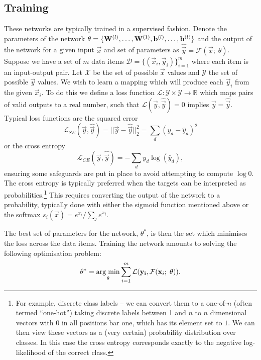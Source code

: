 \subsection{Training}
These networks are typically trained in a supervised fashion. Denote the parameters of the network
\(\theta = \{\mathbf{W}^{(l)}, \ldots, \mathbf{W}^{(1)}, \mathbf{b}^{(l)}, \ldots, \mathbf{b}^{(l)}\}\) and
the output of the network for a given input \(\vec{x}\) and set of parameters as 
\(\hat{\vec{y}} = \mathcal{F}(\vec{x};\; \theta)\). Suppose we have a set of \(m\) data items
\(\mathcal{D} = \{(\vec{x}_i, \vec{y}_i)\}_{i=1}^m\) where each item is an input-output pair. 
Let \(\mathcal{X}\) be the set of possible \(\vec{x}\) values and \(\mathcal{Y}\) the set of
possible \(\vec{y}\) values.
We
wish to learn a mapping which will produce each \(\vec{y}_i\) from the given \(\vec{x}_i\). 
To do this we define a loss function
\(\mathcal{L} : \mathcal{Y} \times \mathcal{Y} \to \mathbb{R}\) which maps pairs of valid outputs
to a real number, such that \(\mathcal{L}(\vec{y}, \hat{\vec{y}}) = 0\) implies 
\(\vec{y} = \hat{\vec{y}}\). Typical loss functions are the squared error
\begin{equation} \label{eq:squarederror}
	\mathcal{L}_{SE}(\vec{y}, \hat{\vec{y}}) = ||\vec{y} - \hat{\vec{y}}||^2_2 
	= \sum_d (y_d - \hat{y}_d)^2
\end{equation} or the cross entropy
\begin{equation}
	\mathcal{L}_{CE}(\vec{y}, \hat{\vec{y}}) = -\sum_d y_d \log(\hat{y}_d),
\end{equation} ensuring some safeguards are put in place to avoid attempting to compute \(\log 0\).
The cross entropy is typically preferred when the targets can be interpreted as
probabilities.\footnote{For example, discrete class labels -- we can convert them to a one-of-\(n\)
(often termed ``one-hot'') taking discrete labels between 1 and \(n\) to \(n\) dimensional vectors
with \(0\) in all positions bar one, which has its element set to \(1\). We can then view these
vectors as a (very certain) probability distribution over classes. In this case the cross entropy
corresponds exactly to the negative log-likelihood of the correct class.} This requires converting
the output of the network to a probability, typically done with either the sigmoid function 
mentioned above or the softmax \(s_i(\vec{x}) = e^{x_i}/\sum_j e^{x_j}\).

The best set of parameters for the network, \(\theta^*\), is then the set which minimises the
loss across the data items. Training the network amounts to solving the following
optimisation problem:
\begin{equation}\label{eq:nnoptimise}
	\theta^* = 
	\operatorname*{arg\;min}_{\theta} \sum_{i=1}^m \mathcal{L}(\mathbf{y_i}, \mathcal{F}(\mathbf{x}_i;\; \theta)).
\end{equation}

